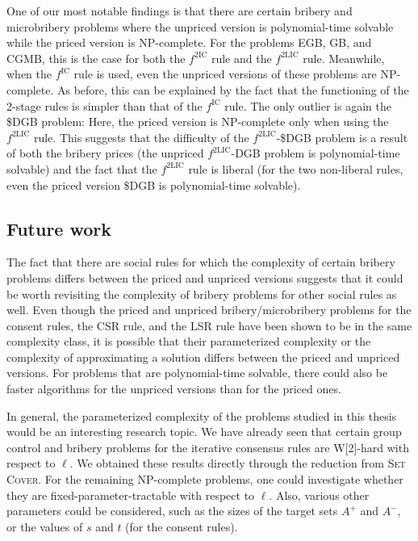 \documentclass[
    12pt,               %
    a4paper,            %
    bibtotoc,           %
    pointlessnumbers,   %
    ngerman,            %
    titlepage,          %
    leqno,              %
    ]{scrarticle}       %
\begin{document}
One of our most notable findings is that there are certain bribery and microbribery problems where the unpriced version is polynomial-time solvable while the priced version is NP-complete. For the problems EGB, GB, and CGMB, this is the case for both the $f^{\text{2IC}}$ rule and the $f^{\text{2LIC}}$ rule. Meanwhile, when the $f^{\text{IC}}$ rule is used, even the unpriced versions of these problems are NP-complete. As before, this can be explained by the fact that the functioning of the 2-stage rules is simpler than that of the $f^{\text{IC}}$ rule. The only outlier is again the \$DGB problem: Here, the priced version is NP-complete only when using the $f^{\text{2LIC}}$ rule. This suggests that the difficulty of the $f^{\text{2LIC}}$-\$DGB problem is a result of both the bribery prices (the unpriced $f^{\text{2LIC}}$-DGB problem is polynomial-time solvable) and the fact that the $f^{\text{2LIC}}$ rule is liberal (for the two non-liberal rules, even the priced version \$DGB is polynomial-time solvable).



\subsection{Future work}
\label{sec:conclusion_future}

The fact that there are social rules for which the complexity of certain bribery problems differs between the priced and unpriced versions suggests that it could be worth revisiting the complexity of bribery problems for other social rules as well. Even though the priced and unpriced bribery/microbribery problems for the consent rules, the CSR rule, and the LSR rule have been shown to be in the same complexity class, it is possible that their parameterized complexity or the complexity of approximating a solution differs between the priced and unpriced versions. For problems that are polynomial-time solvable, there could also be faster algorithms for the unpriced versions than for the priced ones.

In general, the parameterized complexity of the problems studied in this thesis would be an interesting research topic. We have already seen that certain group control and bribery problems for the iterative consensus rules are W[2]-hard with respect to $\ell$. We obtained these results directly through the reduction from \textsc{Set Cover}. For the remaining NP-complete problems, one could investigate whether they are fixed-parameter-tractable with respect to $\ell$. Also, various other parameters could be considered, such as the sizes of the target sets $A^+$ and $A^-$, or the values of $s$ and $t$ (for the consent rules).
\end{document}
